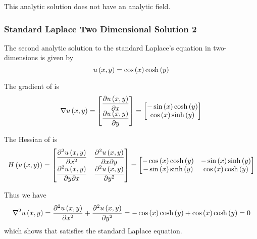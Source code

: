 This analytic solution does not have an analytic field.

\subsubsection{Standard Laplace Two Dimensional Solution 2}
 
The second analytic solution to the standard Laplace's equation in two-dimensions is given by
\begin{equation}
  \fnof{u}{x,y}=\cosine{x}\hypecosine{y}
  \label{eqn:StandardLaplaceTwoDAnalytic2}
\end{equation}

The gradient of  is
\begin{equation}
  \gradient{}{\fnof{u}{x,y}}=\begin{bmatrix}
  \delby{\fnof{u}{x,y}}{x} \\
  \delby{\fnof{u}{x,y}}{y}
  \end{bmatrix}=\begin{bmatrix}
  -\sine{x}\hypecosine{y} \\
  \cosine{x}\hypesine{y}
  \end{bmatrix}
  \label{eqn:StandardLaplaceTwoDAnalyticGradient2}
\end{equation}

The Hessian of  is
\begin{equation}
  \hessian{}{\fnof{u}{x,y}}=\begin{bmatrix}
  \deltwosqby{\fnof{u}{x,y}}{x} & \deltwoby{\fnof{u}{x,y}}{x}{y} \\
  \deltwoby{\fnof{u}{x,y}}{y}{x} & \deltwosqby{\fnof{u}{x,y}}{y}
  \end{bmatrix}=\begin{bmatrix}
  -\cosine{x}\hypecosine{y} & -\sine{x}\hypesine{y} \\
  -\sine{x}\hypesine{y} & \cosine{x}\hypecosine{y}
  \end{bmatrix}
  \label{eqn:StandardLaplaceTwoDAnalyticHessian2}
\end{equation}

Thus we have
\begin{equation}
  \laplacian{}{\fnof{u}{x,y}}=\deltwosqby{\fnof{u}{x,y}}{x}+\deltwosqby{\fnof{u}{x,y}}{y}=-\cosine{x}\hypecosine{y}+
  \cosine{x}\hypecosine{y}=0
\end{equation}
which shows that  satisfies the standard Laplace equation.

